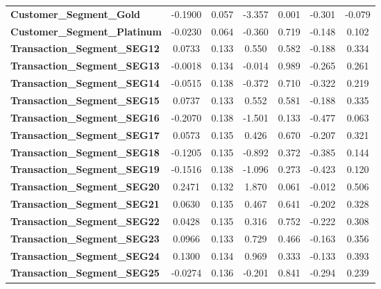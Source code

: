 \documentclass[
  letterpaper,
  DIV=11,
  numbers=noendperiod]{scrartcl}
\begin{document}
\begin{center}
\begin{tabular}{lcccccc}
\textbf{Customer\_Segment\_Gold}     &      -0.1900  &        0.057     &    -3.357  &         0.001        &       -0.301    &       -0.079     \\
\textbf{Customer\_Segment\_Platinum} &      -0.0230  &        0.064     &    -0.360  &         0.719        &       -0.148    &        0.102     \\
\textbf{Transaction\_Segment\_SEG12} &       0.0733  &        0.133     &     0.550  &         0.582        &       -0.188    &        0.334     \\
\textbf{Transaction\_Segment\_SEG13} &      -0.0018  &        0.134     &    -0.014  &         0.989        &       -0.265    &        0.261     \\
\textbf{Transaction\_Segment\_SEG14} &      -0.0515  &        0.138     &    -0.372  &         0.710        &       -0.322    &        0.219     \\
\textbf{Transaction\_Segment\_SEG15} &       0.0737  &        0.133     &     0.552  &         0.581        &       -0.188    &        0.335     \\
\textbf{Transaction\_Segment\_SEG16} &      -0.2070  &        0.138     &    -1.501  &         0.133        &       -0.477    &        0.063     \\
\textbf{Transaction\_Segment\_SEG17} &       0.0573  &        0.135     &     0.426  &         0.670        &       -0.207    &        0.321     \\
\textbf{Transaction\_Segment\_SEG18} &      -0.1205  &        0.135     &    -0.892  &         0.372        &       -0.385    &        0.144     \\
\textbf{Transaction\_Segment\_SEG19} &      -0.1516  &        0.138     &    -1.096  &         0.273        &       -0.423    &        0.120     \\
\textbf{Transaction\_Segment\_SEG20} &       0.2471  &        0.132     &     1.870  &         0.061        &       -0.012    &        0.506     \\
\textbf{Transaction\_Segment\_SEG21} &       0.0630  &        0.135     &     0.467  &         0.641        &       -0.202    &        0.328     \\
\textbf{Transaction\_Segment\_SEG22} &       0.0428  &        0.135     &     0.316  &         0.752        &       -0.222    &        0.308     \\
\textbf{Transaction\_Segment\_SEG23} &       0.0966  &        0.133     &     0.729  &         0.466        &       -0.163    &        0.356     \\
\textbf{Transaction\_Segment\_SEG24} &       0.1300  &        0.134     &     0.969  &         0.333        &       -0.133    &        0.393     \\
\textbf{Transaction\_Segment\_SEG25} &      -0.0274  &        0.136     &    -0.201  &         0.841        &       -0.294    &        0.239     \\
\bottomrule
\end{tabular}
\end{center}
\end{document}
